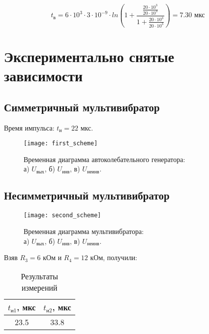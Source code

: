 \begin{displaymath}
	t_{\text{в}} = 6 \cdot 10^3 \cdot 3 \cdot 10^{-9} \cdot ln\left(1 + \frac{\frac{20 \cdot 10^3}{20 \cdot 10^3}}{1 + \frac{20 \cdot 10^3}{20 \cdot 10^3}}\right) = 7.30 \text{ мкс}
\end{displaymath}

\newpage

\section{Экспериментально снятые зависимости}

\subsection{Симметричный мультивибратор}

Время импульса: $t_{и} = 22$ мкс.


\begin{figure}[H]
\begin{center}
	\texttt{[image: first\_scheme]}
	\captionsetup{margin=0cm}
	\caption{Временная диаграмма автоколебательного генератора:\\ а) $U_\text{вых}$, б) $U_\text{инв}$, в) $U_\text{неинв}$.} 
	\label{fig:diff}
\end{center}
\end{figure}

\subsection{Несимметричный мультивибратор}

\begin{figure}[H]
\begin{center}
	\texttt{[image: second\_scheme]}
	\captionsetup{margin=0cm}
	\caption{Временная диаграмма мультивибратора:\\ а) $U_\text{вых}$, б) $U_\text{инв}$, в) $U_\text{неинв}$.} 
	\label{fig:diff}
\end{center}
\end{figure}

Взяв $R_3 = 6$ кОм и $R_4 = 12$ кОм, получили:

\begin{table}[H]
\begin{center}
	\caption{Результаты измерений}
	\def\tabcolsep{10pt}
	\begin{tabular}{|c|c|}
		\hline
		$t_{\text{и1}}$, мкс &
		$t_{\text{и2}}$, мкс \\
		\hline
		23.5 &
		33.8 \\
	    \hline	
	\end{tabular}
\end{center}
\end{table}

